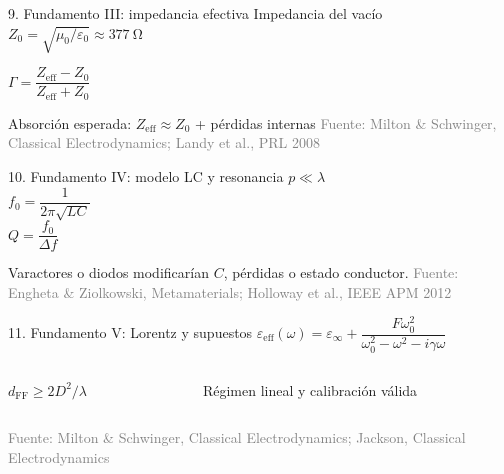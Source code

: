 \documentclass[aspectratio=169]{beamer}
\newcommand{\rubrica}[2]{\vspace{0.1cm}{\scriptsize\textcolor{deepblue}{Rúbrica #1 · #2}}}
\newcommand{\fuente}[1]{\vfill{\tiny\textcolor{gray}{Fuente: #1}}}
\begin{document}
\begin{frame}{9. Fundamento III: impedancia efectiva}
  \centering
  {\Large Impedancia del vacío}\\[0.1cm]
  {\Huge\(Z_0=\sqrt{\mu_0/\varepsilon_0}\approx\SI{377}{\ohm}\)}

  \vfill
  {\Huge\(\Gamma=\dfrac{Z_{\mathrm{eff}}-Z_0}{Z_{\mathrm{eff}}+Z_0}\)}

  \vfill
  {\Large Absorción esperada: \(Z_{\mathrm{eff}}\approx Z_0\) + pérdidas internas}
  \fuente{Milton \& Schwinger, Classical Electrodynamics; Landy et al., PRL 2008}
  \rubrica{3}{Condición física de absorción}
\end{frame}

\begin{frame}{10. Fundamento IV: modelo LC y resonancia}
  \centering
  {\Huge\(p\ll\lambda\)}\\[0.35cm]
  {\Huge\(f_0=\dfrac{1}{2\pi\sqrt{LC}}\)}\\[0.35cm]
  {\Huge\(Q=\dfrac{f_0}{\Delta f}\)}

  \vfill
  {\Large Varactores o diodos modificarían \(C\), pérdidas o estado conductor.}
  \fuente{Engheta \& Ziolkowski, Metamaterials; Holloway et al., IEEE APM 2012}
  \rubrica{3}{Resonancia sublongitud de onda}
\end{frame}

\begin{frame}{11. Fundamento V: Lorentz y supuestos}
  \centering
  {\Large\(
  \varepsilon_{\mathrm{eff}}(\omega)=\varepsilon_\infty+
  \dfrac{F\omega_0^2}{\omega_0^2-\omega^2-i\gamma\omega}
  \)}

  \vfill
  \begin{columns}[T]
    \begin{column}{0.48\textwidth}
      \centering\Large \(d_{\mathrm{FF}}\ge 2D^2/\lambda\)
    \end{column}
    \begin{column}{0.48\textwidth}
      \centering\Large Régimen lineal y calibración válida
    \end{column}
  \end{columns}
  \fuente{Milton \& Schwinger, Classical Electrodynamics; Jackson, Classical Electrodynamics}
  \rubrica{3}{30\% de la evaluación}
\end{frame}
\end{document}
